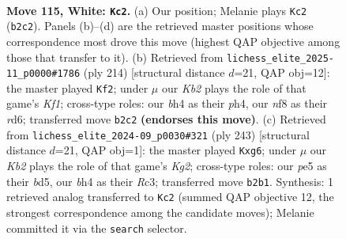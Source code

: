 \documentclass[11pt]{article}
\begin{document}
\begin{figure}[p]\centering
\begin{subfigure}{0.46\textwidth}\centering
\resizebox{\linewidth}{!}{%
\newchessgame
\chessboard[
  setfen={5n2/8/1R5p/r3p3/7b/7k/1K1p4/8 w - - 0 115},
  showmover=false,
  pgfstyle=straightmove, color=movearrow, markmove={b2-c2}
]}
\caption{}
\end{subfigure}\hfill
\begin{subfigure}{0.46\textwidth}\centering
\resizebox{\linewidth}{!}{%
\newchessgame
\chessboard[
  setfen={8/1B6/3r2b1/8/5k1p/5p1P/8/5K2 w - - 0 108},
  showmover=false,
  pgfstyle=straightmove, color=movearrow, markmove={f1-f2}
]}
\caption{}
\end{subfigure}
\\[4pt]
\begin{subfigure}{0.46\textwidth}\centering
\resizebox{\linewidth}{!}{%
\newchessgame
\chessboard[
  setfen={1R6/6k1/6P1/3B4/8/2r1p2P/8/3R2K1 b - - 0 122},
  showmover=false,
  pgfstyle=straightmove, color=movearrow, markmove={g7-g6}
]}
\caption{}
\end{subfigure}\hfill

\caption{\textbf{Move 115, White: \texttt{Kc2}.} (a) Our position; Melanie plays \texttt{Kc2} (\texttt{b2c2}). Panels (b)--(d) are the retrieved master positions whose correspondence most drove this move (highest QAP objective among those that transfer to it). (b) Retrieved from \texttt{lichess\_elite\_2025-11\_p0000\#1786} (ply 214) [structural distance $d$=21, QAP obj=12]: the master played \texttt{Kf2}; under $\mu$ our \emph{Kb2} plays the role of that game's \emph{Kf1}; cross-type roles: our \emph{b}h4 as their \emph{p}h4, our \emph{n}f8 as their \emph{r}d6; transferred move \texttt{b2c2} \textbf{(endorses this move)}. (c) Retrieved from \texttt{lichess\_elite\_2024-09\_p0030\#321} (ply 243) [structural distance $d$=21, QAP obj=1]: the master played \texttt{Kxg6}; under $\mu$ our \emph{Kb2} plays the role of that game's \emph{Kg2}; cross-type roles: our \emph{p}e5 as their \emph{b}d5, our \emph{b}h4 as their \emph{R}c3; transferred move \texttt{b2b1}. Synthesis: 1 retrieved analog transferred to \texttt{Kc2} (summed QAP objective 12, the strongest correspondence among the candidate moves); Melanie committed it via the \texttt{search} selector.}
\label{fig:thought-m228}
\end{figure}

\clearpage
\end{document}
